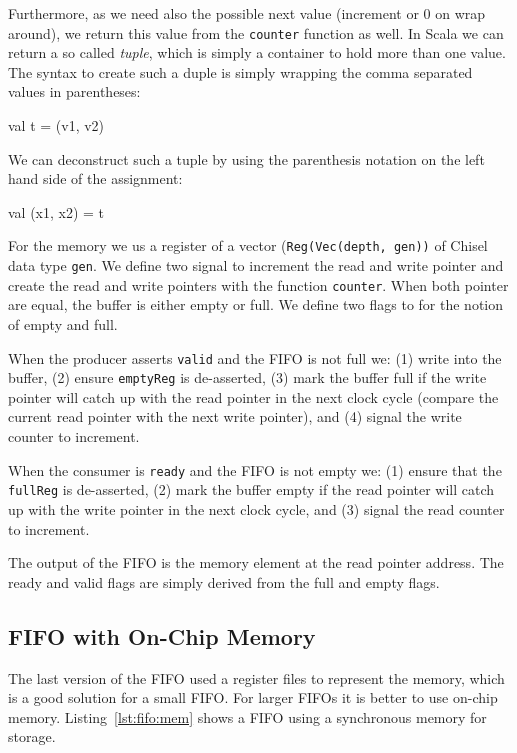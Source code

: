 \documentclass[%
    10pt,
    headinclude, footexclude,
    openright, %
    notitlepage,
    cleardoubleempty,
    headsepline,
    pointlessnumbers,
    bibtotoc, idxtotoc,
    ]{scrbook}
\newcommand{\code}[1]{{\small{\texttt{#1}}}}
\begin{document}
Furthermore, as we need also the
possible next value (increment or 0 on wrap around), we return this value from
the \code{counter} function as well. In Scala we can return a so called \emph{tuple},
which is simply a container to hold more than one value. The syntax to create
such a duple is simply wrapping the comma separated values in parentheses:

\begin{chisel}
  val t = (v1, v2)
\end{chisel}

\noindent We can deconstruct such a tuple by using the parenthesis notation
on the left hand side of the assignment:

\begin{chisel}
val (x1, x2) = t
\end{chisel}

For the memory we us a register of a vector (\code{Reg(Vec(depth, gen))} of
Chisel data type \code{gen}. We define two signal to increment the read and
write pointer and create the read and write pointers with the function \code{counter}.
When both pointer are equal, the buffer is either empty or full.
We define two flags to for the notion of empty and full.

When the producer asserts \code{valid} and the FIFO is not full we:
(1) write into the buffer, (2) ensure \code{emptyReg} is de-asserted,
(3) mark the buffer full if the write pointer will catch up with the read pointer
in the next clock cycle (compare the current read pointer with the next
write pointer), and (4) signal the write counter to increment.

When the consumer is \code{ready} and the FIFO is not empty we:
(1) ensure that the \code{fullReg} is de-asserted, (2) mark the buffer
empty if the read pointer will catch up with the write pointer in
the next clock cycle, and (3) signal the read counter to increment.

The output of the FIFO is the memory element at the read pointer address.
The ready and valid flags are simply derived from the full and empty
flags.

\subsection{FIFO with On-Chip Memory}

The last version of the FIFO used a register files to represent the memory,
which is a good solution for a small FIFO. For larger FIFOs it is better to
use on-chip memory.
Listing~\ref{lst:fifo:mem} shows a FIFO using a synchronous memory for
storage.
\end{document}
